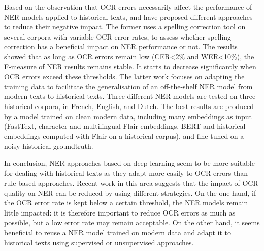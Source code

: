 Based on the observation that OCR errors necessarily affect the performance of NER models applied to historical texts, \cite{huynh2020use} and \cite{marz2021data} have proposed different approaches to reduce their negative impact. The former uses a spelling correction tool on several corpora with variable OCR error rates, to assess whether spelling correction has a beneficial impact on NER performance or not. The results showed that as long as OCR errors remain low (CER<2\% and WER<10\%), the F-measure of NER results remains stable. It starts to decrease significantly when OCR errors exceed these thresholds. The latter work focuses on adapting the training data to facilitate the generalisation of an off-the-shelf NER model from modern texts to historical texts. Three different NER models are tested on three historical corpora, in French, English, and Dutch. The best results are produced by a model trained on clean modern data, including many  embeddings as input (FastText, character and multilingual Flair embeddings, BERT and historical embeddings computed with Flair on a historical corpus), and fine-tuned on a noisy historical groundtruth.

In conclusion, NER approaches based on deep learning seem to be more suitable for dealing with historical texts as they adapt more easily to OCR errors than rule-based approaches. Recent work in this area suggests that the impact of OCR quality on NER can be reduced by using different strategies. On the one hand, if the OCR error rate is kept below a certain threshold, the NER models remain little impacted: it is therefore important to reduce OCR errors as much as possible, but a low error rate may remain acceptable. On the other hand, it seems beneficial to reuse a NER model trained on modern data and adapt it to historical texts using supervised or unsupervised approaches. 





